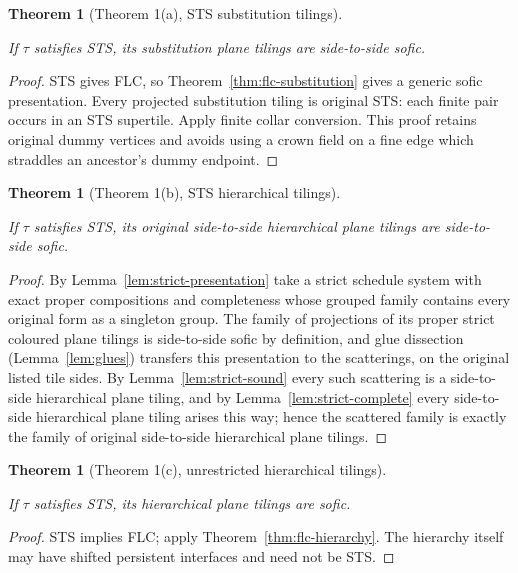 \documentclass[11pt,a4paper]{article}
\newtheorem{theorem}[definition]{Theorem}
\theoremstyle{remark}
\newcommand{\lean}[1]{}
\newcommand{\uses}[1]{}
\begin{document}
\begin{theorem}[Theorem 1(a), STS substitution tilings]\label{thm:sts-substitution}
\lean{Tilings.Main.sts_substitution_sofic}
\uses{def:sofic,def:sts,lem:sts-flc,thm:flc-substitution,lem:collar-conversion}
If $\tau$ satisfies STS, its substitution plane tilings are side-to-side sofic.
\end{theorem}
\begin{proof}
STS gives FLC, so Theorem~\ref{thm:flc-substitution} gives a generic sofic
presentation. Every projected substitution tiling is original STS: each
finite pair occurs in an STS supertile. Apply finite collar conversion.
This proof retains original dummy vertices and avoids using a crown field
on a fine edge which straddles an ancestor's dummy endpoint.
\end{proof}

\begin{theorem}[Theorem 1(b), STS hierarchical tilings]\label{thm:sts-stshierarchy}
\lean{Tilings.Main.sts_side_to_side_hierarchy_sofic}
\uses{def:sofic,def:sts,lem:strict-presentation,lem:strict-sound,lem:strict-complete,lem:glues}
If $\tau$ satisfies STS, its original side-to-side hierarchical plane
tilings are side-to-side sofic.
\end{theorem}
\begin{proof}
By Lemma~\ref{lem:strict-presentation} take a strict schedule system with
exact proper compositions and completeness whose grouped family contains
every original form as a singleton group. The family of projections of its
proper strict coloured plane tilings is side-to-side sofic by definition,
and glue dissection (Lemma~\ref{lem:glues}) transfers this presentation to
the scatterings, on the original listed tile sides. By
Lemma~\ref{lem:strict-sound} every such scattering is a side-to-side
hierarchical plane tiling, and by Lemma~\ref{lem:strict-complete} every
side-to-side hierarchical plane tiling arises this way; hence the scattered
family is exactly the family of original side-to-side hierarchical plane
tilings.
\end{proof}

\begin{theorem}[Theorem 1(c), unrestricted hierarchical tilings]\label{thm:sts-hierarchy}
\lean{Tilings.Main.sts_hierarchy_sofic}
\uses{def:sofic,def:sts,lem:sts-flc,thm:flc-hierarchy}
If $\tau$ satisfies STS, its hierarchical plane tilings are sofic.
\end{theorem}
\begin{proof}
STS implies FLC; apply Theorem~\ref{thm:flc-hierarchy}. The hierarchy itself
may have shifted persistent interfaces and need not be STS.
\end{proof}
\end{document}
